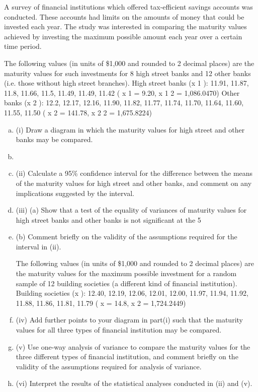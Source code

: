 \documentclass[a4paper,12pt]{article}
\begin{document}

A survey of financial institutions which offered tax-efficient savings accounts was conducted. These accounts had limits on the amounts of money that could be invested each year. The study was interested in comparing the maturity values achieved by investing the maximum possible amount each year over a certain time period.

The following values (in units of \$1,000 and rounded to 2 decimal places) are the
maturity values for such investments for 8 high street banks and 12 other banks (i.e.
those without high street branches).
High street banks (x 1 ): 11.91, 11.87, 11.8, 11.66, 11.5, 11.49, 11.49, 11.42
( x 1 = 9.20, x 1 2 = 1,086.0470)
Other banks (x 2 ): 12.2, 12.17, 12.16, 11.90, 11.82, 11.77, 11.74, 11.70, 11.64, 11.60,
11.55, 11.50
( x 2 = 141.78, x 2 2 = 1,675.8224)
\begin{enumerate}[(a)]
 \item (i) Draw a diagram in which the maturity values for high street and other banks
may be compared.
\item 
\item (ii) Calculate a 95\% confidence interval for the difference between the means of the maturity values for high street and other banks, and comment on any
implications suggested by the interval.
\item (iii) (a)
Show that a test of the equality of variances of maturity values for high street banks and other banks is not significant at the 5%
\item (b)
Comment briefly on the validity of the assumptions required for the interval in (ii).

The following values (in units of \$1,000 and rounded to 2 decimal places) are the
maturity values for the maximum possible investment for a random sample of 12
building societies (a different kind of financial institution).
Building societies (x  ): 12.40, 12.19, 12.06, 12.01, 12.00, 11.97, 11.94, 11.92, 11.88,
11.86, 11.81, 11.79
( x  = 14.8, x  2 = 1,724.2449)
\item (iv) Add further points to your diagram in part(i) such that the maturity values for
all three types of financial institution may be compared.
\item (v) Use one-way analysis of variance to compare the maturity values for the three different types of financial institution, and comment briefly on the validity of
the assumptions required for analysis of variance.
\item (vi) Interpret the results of the statistical analyses conducted in (ii) and (v).
\end{enumerate}
\end{document}
